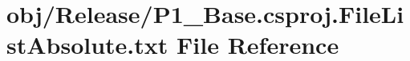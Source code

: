 \hypertarget{_release_2_p1___base_8csproj_8_file_list_absolute_8txt}{\section{obj/\-Release/\-P1\-\_\-\-Base.csproj.\-File\-List\-Absolute.\-txt File Reference}
\label{_release_2_p1___base_8csproj_8_file_list_absolute_8txt}
}
